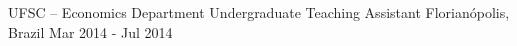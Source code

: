 \begin{cventries}
    \cventry
    {UFSC -- Economics Department} %
    {Undergraduate Teaching Assistant} %
    {Florianópolis, Brazil} %
    {Mar 2014 - Jul 2014} %
    {
    }


\end{cventries}

